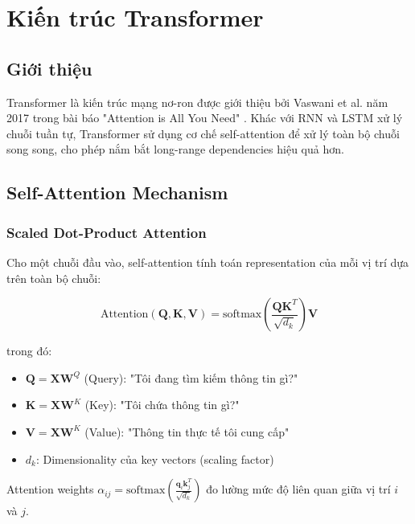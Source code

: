 \section{Kiến trúc Transformer}
\label{sec:transformer}

\subsection{Giới thiệu}

Transformer là kiến trúc mạng nơ-ron được giới thiệu bởi Vaswani et al. năm 2017 trong bài báo "Attention is All You Need" \cite{vaswani2017attention}. Khác với RNN và LSTM xử lý chuỗi tuần tự, Transformer sử dụng cơ chế self-attention để xử lý toàn bộ chuỗi song song, cho phép nắm bắt long-range dependencies hiệu quả hơn.

\subsection{Self-Attention Mechanism}

\subsubsection{Scaled Dot-Product Attention}

Cho một chuỗi đầu vào, self-attention tính toán representation của mỗi vị trí dựa trên toàn bộ chuỗi:

\begin{equation}
\text{Attention}(\mathbf{Q}, \mathbf{K}, \mathbf{V}) = \text{softmax}\left(\frac{\mathbf{Q}\mathbf{K}^T}{\sqrt{d_k}}\right)\mathbf{V}
\end{equation}

trong đó:
\begin{itemize}
    \item $\mathbf{Q} = \mathbf{X}\mathbf{W}^Q$ (Query): "Tôi đang tìm kiếm thông tin gì?"
    \item $\mathbf{K} = \mathbf{X}\mathbf{W}^K$ (Key): "Tôi chứa thông tin gì?"
    \item $\mathbf{V} = \mathbf{X}\mathbf{W}^K$ (Value): "Thông tin thực tế tôi cung cấp"
    \item $d_k$: Dimensionality của key vectors (scaling factor)
\end{itemize}

Attention weights $\alpha_{ij} = \text{softmax}\left(\frac{\mathbf{q}_i \mathbf{k}_j^T}{\sqrt{d_k}}\right)$ đo lường mức độ liên quan giữa vị trí $i$ và $j$.


